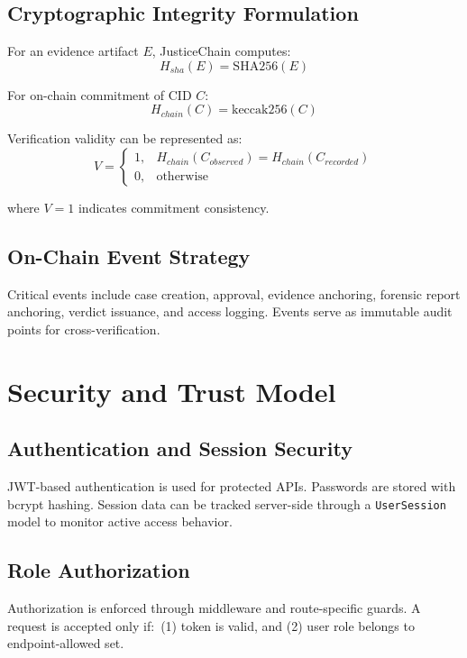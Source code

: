 \documentclass[conference]{IEEEtran}
\begin{document}
\subsection{Cryptographic Integrity Formulation}
For an evidence artifact $E$, JusticeChain computes:
\begin{equation}
H_{sha}(E) = \text{SHA256}(E)
\end{equation}

For on-chain commitment of CID $C$:
\begin{equation}
H_{chain}(C) = \text{keccak256}(C)
\end{equation}

Verification validity can be represented as:
\begin{equation}
V =
\begin{cases}
1, & H_{chain}(C_{observed}) = H_{chain}(C_{recorded}) \\
0, & \text{otherwise}
\end{cases}
\end{equation}

where $V=1$ indicates commitment consistency.

\subsection{On-Chain Event Strategy}
Critical events include case creation, approval, evidence anchoring, forensic report anchoring, verdict issuance, and access logging. Events serve as immutable audit points for cross-verification.

\section{Security and Trust Model}
\subsection{Authentication and Session Security}
JWT-based authentication is used for protected APIs. Passwords are stored with bcrypt hashing. Session data can be tracked server-side through a \texttt{UserSession} model to monitor active access behavior.

\subsection{Role Authorization}
Authorization is enforced through middleware and route-specific guards. A request is accepted only if:\
(1) token is valid, and (2) user role belongs to endpoint-allowed set.
\end{document}
